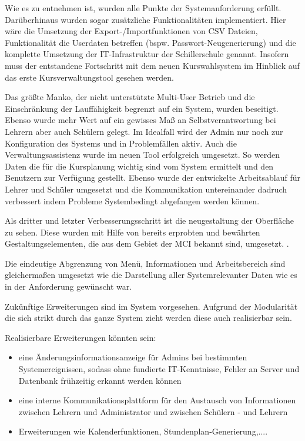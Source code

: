 \documentclass[12pt, twoside, a4paper, ngerman]{article}
\begin{document}
Wie es  zu entnehmen ist, wurden alle Punkte der Systemanforderung erfüllt. Darüberhinaus wurden sogar zusätzliche Funktionalitäten implementiert.
Hier wäre die Umsetzung der Export-/Importfunktionen von CSV Dateien, Funktionalität die Userdaten betreffen (bspw. Passwort-Neugenerierung) und die komplette Umsetzung der \ac{IT}-Infrastruktur der Schillerschule genannt. 
Insofern muss der entstandene Fortschritt mit dem neuen Kurswahlsystem im Hinblick auf das erste Kursverwaltungstool gesehen werden.

Das größte Manko, der nicht unterstützte Multi-User Betrieb und die Einschränkung der Lauffähigkeit begrenzt auf ein System, wurden beseitigt. Ebenso wurde mehr Wert auf ein gewisses Maß an Selbstverantwortung bei Lehrern aber auch Schülern gelegt.
Im Idealfall wird der Admin nur noch zur Konfiguration des Systems und in Problemfällen aktiv.
Auch die Verwaltungsassistenz wurde im neuen Tool erfolgreich umgesetzt. So werden Daten die für die Kursplanung wichtig sind vom System ermittelt und den Benutzern zur Verfügung gestellt. 
Ebenso wurde der entwickelte Arbeitsablauf für Lehrer und Schüler umgesetzt und die Kommunikation untereinander dadruch verbessert indem Probleme Systembedingt abgefangen werden können.

Als dritter und letzter Verbesserungsschritt ist die neugestaltung der Oberfläche zu sehen. Diese wurden mit Hilfe von bereits erprobten und bewährten Gestaltungselementen, die aus dem Gebiet der \ac{MCI} bekannt sind, umgesetzt. \cite{DahmMCI}.

Die eindeutige Abgrenzung von Menü, Informationen und Arbeitsbereich sind gleichermaßen umgesetzt wie die Darstellung aller Systemrelevanter Daten wie es in der Anforderung gewünscht war.

Zukünftige Erweiterungen sind im System vorgesehen. Aufgrund der Modularität die sich strikt durch das ganze System zieht werden diese auch realisierbar sein.

Realisierbare Erweiterungen könnten sein:
\begin{itemize}
  \item eine Änderungsinformationsanzeige für Admins bei bestimmten Systemereignissen, sodass ohne fundierte \ac{IT}-Kenntnisse, Fehler an Server und Datenbank frühzeitig erkannt werden können
  \item eine interne Kommunikationsplattform für den Austausch von Informationen zwischen Lehrern und Administrator und zwischen Schülern - und Lehrern  
  \item Erweiterungen wie Kalenderfunktionen, Stundenplan-Generierung,....
\end{itemize}
  
\end{document}
